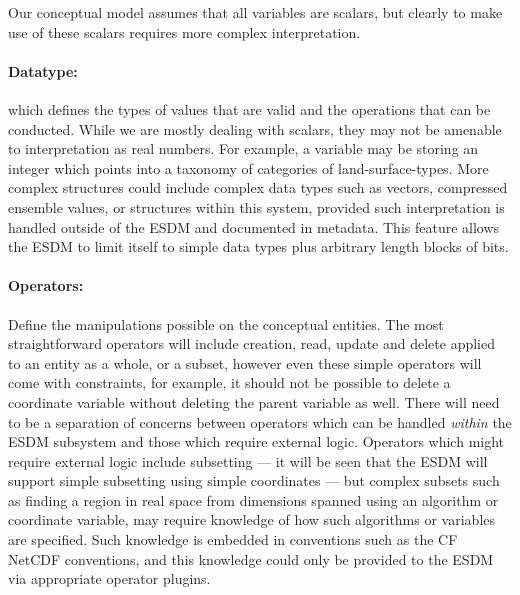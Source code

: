 Our conceptual model assumes that all variables are scalars, but clearly to make use of these scalars requires more complex interpretation.

\paragraph{Datatype:}
which defines the types of values that are valid and the operations that can be conducted.
While we are mostly dealing with scalars, they may not be amenable to interpretation as real numbers.
For example, a variable may be storing an integer which points into a taxonomy of categories of land-surface-types.
More complex structures could include complex data types such as vectors, compressed ensemble values, or structures within this system, provided such interpretation is handled outside of the ESDM and documented in metadata.  This feature allows the ESDM to limit itself to simple data types plus arbitrary length blocks of bits.

\paragraph{Operators:} Define the manipulations possible on the conceptual entities. The most straightforward operators will include creation, read, update and delete applied to an entity as a whole, or a subset, however even these simple operators will come with constraints, for example, it should not be possible to delete a coordinate variable without deleting the parent variable as well. There will need to be a separation of concerns between operators which can be handled  \textit{within} the ESDM subsystem and those which require external logic. Operators which might require external logic include subsetting --- it will be seen that the ESDM will support simple subsetting using simple coordinates ---  but complex subsets such as finding a region in real space from dimensions spanned using an algorithm or coordinate variable, may require knowledge of how such algorithms or variables are specified.
Such knowledge is embedded in conventions such as the CF NetCDF conventions, and this knowledge could only be provided to the ESDM via appropriate operator plugins.




